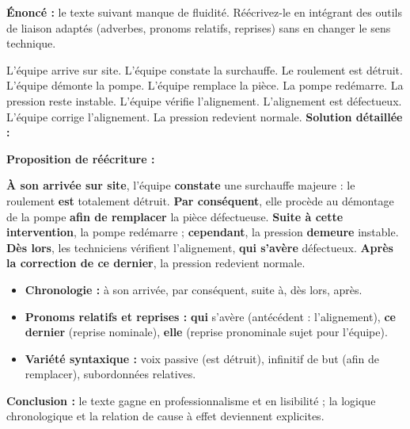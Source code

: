 \documentclass[11pt]{article}
\newcommand{\cle}[1]{{\popxbold\color{popdark}#1}}
\begin{document}
\begin{exoresolu}
    \textbf{Énoncé :} le texte suivant manque de fluidité. Réécrivez-le en intégrant des outils de liaison adaptés (adverbes, pronoms relatifs, reprises) sans en changer le sens technique.

    \og L'équipe arrive sur site. L'équipe constate la surchauffe. Le roulement est détruit. L'équipe démonte la pompe. L'équipe remplace la pièce. La pompe redémarre. La pression reste instable. L'équipe vérifie l'alignement. L'alignement est défectueux. L'équipe corrige l'alignement. La pression redevient normale.\fg
    \tcblower
    \textbf{Solution détaillée :}

    \textbf{Proposition de réécriture :}

    \og \textbf{À son arrivée sur site}, l'équipe \textbf{constate} une surchauffe majeure : le roulement \textbf{est} totalement détruit. \textbf{Par conséquent}, elle procède au démontage de la pompe \textbf{afin de remplacer} la pièce défectueuse. \textbf{Suite à cette intervention}, la pompe redémarre ; \textbf{cependant}, la pression \textbf{demeure} instable. \textbf{Dès lors}, les techniciens vérifient l'alignement, \textbf{qui s'avère} défectueux. \textbf{Après la correction de ce dernier}, la pression redevient normale.\fg
    \begin{itemize}
        \item \textbf{Chronologie :} \og à son arrivée\fg, \og par conséquent\fg, \og suite à\fg, \og dès lors\fg, \og après\fg.
        \item \textbf{Pronoms relatifs et reprises :} \og \textbf{qui} s'avère\fg{} (antécédent : l'alignement), \og \textbf{ce dernier}\fg{} (reprise nominale), \og \textbf{elle}\fg{} (reprise pronominale sujet pour l'équipe).
        \item \textbf{Variété syntaxique :} voix passive (\og est détruit\fg), infinitif de but (\og afin de remplacer\fg), subordonnées relatives.
    \end{itemize}
    \textbf{Conclusion :} le texte gagne en \cle{professionnalisme} et en \cle{lisibilité} ; la logique chronologique et la relation de cause à effet deviennent explicites.
\end{exoresolu}
\end{document}
